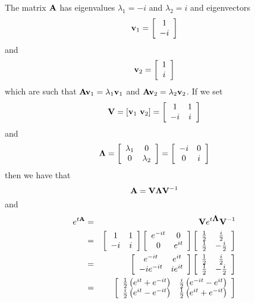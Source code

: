 \begin{solution}
\begin{enumerate}
The matrix ${\bf A}$ has eigenvalues $\lambda_1 = -i$ and $\lambda_2 = i$ and eigenvectors
\[
{\bf v}_1 = \left[\begin{array}{c}1 \\ -i\end{array}\right]
\]
and
\[
{\bf v}_2 = \left[\begin{array}{c}1 \\ i\end{array}\right]
\]
which are such that ${\bf A}{\bf v}_1=\lambda_1{\bf v}_1$ and ${\bf A}{\bf v}_2=\lambda_2{\bf v}_2$. If we set
\[
{\bf V} = [{\bf v}_1\ {\bf v}_2]=\left[\begin{array}{cc}1 & 1 \\ -i & i\end{array}\right]
\]
and
\[
\mbox{\boldmath$\Lambda$} = \left[\begin{array}{cc}\lambda_1 & 0 \\ 0 & \lambda_2\end{array}\right]=\left[\begin{array}{cc}-i & 0 \\ 0 & i\end{array}\right]
\]
then we have that
\[
{\bf A} = {\bf V}\mbox{\boldmath$\Lambda$}{\bf V}^{-1}
\]
and
\begin{eqnarray*}
e^{t\BA}&=&\BV e^{t\BLambda} \BV^{-1}
\\
&=&\left[\begin{array}{cc}1 & 1 \\ -i & i\end{array}\right] \left[\begin{array}{cc}e^{-it} & 0 \\ 0 & e^{it}\end{array}\right] \left[\begin{array}{cc}{1\over 2} & {i\over 2} \\ {1\over 2} & -{i\over 2}\end{array}\right]
\\
&=&\left[\begin{array}{cc}e^{-it} & e^{it} \\ -ie^{-it} & ie^{it}\end{array}\right] \left[\begin{array}{cc}{1\over 2} & {i\over 2} \\ {1\over 2} & -{i\over 2}\end{array}\right]
\\
&=&\left[\begin{array}{cc}{1\over2}\left(e^{it} + e^{-it}\right) & {i\over2}\left(e^{-it} - e^{it}\right) \\ {i\over2}\left(e^{it}-e^{-it}\right) & {1\over2}\left(e^{it}+e^{-it}\right)\end{array}\right]

\end{eqnarray*}
\end{enumerate}
\end{solution}
